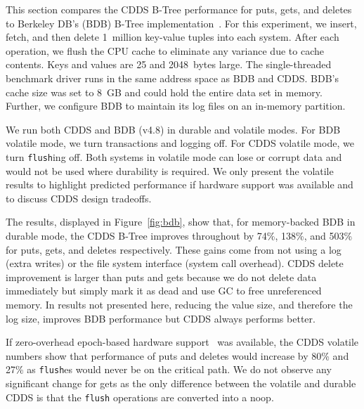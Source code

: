 This section compares the CDDS B-Tree performance for puts, gets, and
deletes to Berkeley DB's (BDB) B-Tree implementation~\citep{Olson99}.
For this experiment, we insert, fetch, and then delete 1~million
key-value tuples into each system.  After each operation, we flush
the CPU cache to eliminate any variance due to cache contents.
Keys and values are 25 and 2048~bytes large.  The single-threaded
benchmark driver runs in the same address space as BDB and CDDS\@.
BDB's cache size was set to 8~GB and could hold the entire data
set in memory. Further, we configure BDB to maintain its log files
on an in-memory partition.

We run both CDDS and BDB (v4.8) in durable and volatile modes.  For
BDB volatile mode, we turn transactions and logging off.  For CDDS
volatile mode, we turn \texttt{flush}ing off.  Both systems in
volatile mode can lose or corrupt data and would not be used where
durability is required.  We only present the volatile results to
highlight predicted performance if hardware support was available and
to discuss CDDS design tradeoffs.

The results, displayed in Figure~\ref{fig:bdb}, show that, for
memory-backed BDB in durable mode, the CDDS B-Tree improves throughout
by 74\%, 138\%, and 503\% for puts, gets, and deletes respectively.
These gains come from not using a log (extra writes) or the file
system interface (system call overhead).  CDDS delete improvement is
larger than puts and gets because we do not delete data immediately
but simply mark it as dead and use GC to free unreferenced memory.  In
results not presented here, reducing the value size, and therefore the
log size, improves BDB performance but CDDS always performs better.


If zero-overhead epoch-based hardware support~\citep{Condit09} was
available, the CDDS volatile numbers show that performance of puts
and deletes would increase by 80\% and 27\% as \texttt{flush}es
would never be on the critical path. We do not observe any significant
change for gets as the only difference between the volatile and durable
CDDS is that the \texttt{flush} operations are converted into a noop.

